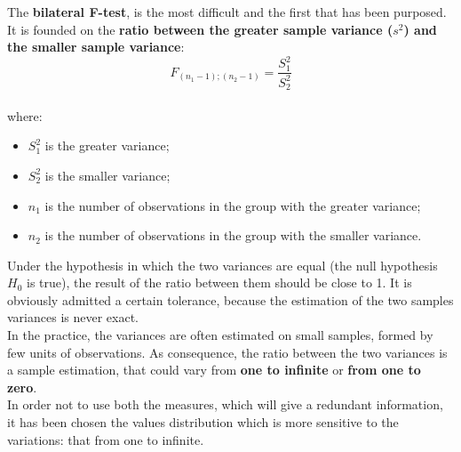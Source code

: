 \begin{frame}
  \vspace*{.25cm}
  The \textbf{bilateral F-test}, is the most difficult and the first that has been purposed. It is founded on the \textbf{ratio between the greater sample variance ({\boldmath $ s^2 $}) and the smaller sample variance}:\\
  \vspace*{.25cm}
  $$ F_{(n_1-1);(n_2-1)} = \frac{S^2_1}{S^2_2} $$\\
  \vspace*{.25cm}
  where:
  \vspace*{.25cm}
  \begin{itemize}
    \item $ S^2_1 $ is the greater variance;
    \item $ S^2_2 $ is the smaller variance;
    \item $ n_1 $ is the number of observations in the group with the greater variance;
    \item $ n_2 $ is the number of observations in the group with the smaller variance.
  \end{itemize}
\end{frame}

\begin{frame}
  \vspace*{.25cm}
  Under the hypothesis in which the two variances are equal (the null hypothesis $H_0$ is true), the result of the ratio between them should be close to 1. It is obviously admitted a certain tolerance, because the estimation of the two samples variances is never exact.\\
  \vspace*{.25cm}
  In the practice, the variances are often estimated on small samples, formed by few units of observations. As consequence, the ratio between the two variances is a sample estimation, that could vary from \textbf{one to infinite} or \textbf{from one to zero}.\\
  \vspace*{.25cm}
  In order not to use both the measures, which will give a redundant information, it has been chosen the values distribution which is more sensitive to the variations: that from one to infinite.
\end{frame}

